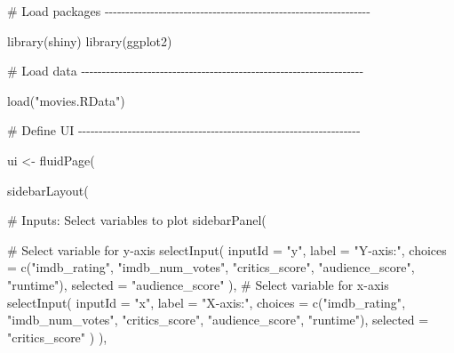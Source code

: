 \documentclass[
  letterpaper,
  DIV=11,
  numbers=noendperiod]{scrreprt}
\newenvironment{Shaded}{\begin{snugshade}}{\end{snugshade}}
\newcommand{\AttributeTok}[1]{\textcolor[rgb]{0.40,0.46,0.14}{#1}}
\newcommand{\CommentTok}[1]{\textcolor[rgb]{0.37,0.37,0.37}{#1}}
\newcommand{\FunctionTok}[1]{\textcolor[rgb]{0.28,0.35,0.67}{#1}}
\newcommand{\NormalTok}[1]{\textcolor[rgb]{0.00,0.46,0.62}{#1}}
\newcommand{\OtherTok}[1]{\textcolor[rgb]{0.00,0.46,0.62}{#1}}
\newcommand{\StringTok}[1]{\textcolor[rgb]{0.13,0.47,0.30}{#1}}
\begin{document}
\begin{Shaded}
\begin{Highlighting}[]
\CommentTok{\# Load packages {-}{-}{-}{-}{-}{-}{-}{-}{-}{-}{-}{-}{-}{-}{-}{-}{-}{-}{-}{-}{-}{-}{-}{-}{-}{-}{-}{-}{-}{-}{-}{-}{-}{-}{-}{-}{-}{-}{-}{-}{-}{-}{-}{-}{-}{-}{-}{-}{-}{-}{-}{-}{-}{-}{-}{-}{-}{-}{-}{-}{-}{-}{-}{-}}

\FunctionTok{library}\NormalTok{(shiny)}
\FunctionTok{library}\NormalTok{(ggplot2)}

\CommentTok{\# Load data {-}{-}{-}{-}{-}{-}{-}{-}{-}{-}{-}{-}{-}{-}{-}{-}{-}{-}{-}{-}{-}{-}{-}{-}{-}{-}{-}{-}{-}{-}{-}{-}{-}{-}{-}{-}{-}{-}{-}{-}{-}{-}{-}{-}{-}{-}{-}{-}{-}{-}{-}{-}{-}{-}{-}{-}{-}{-}{-}{-}{-}{-}{-}{-}{-}{-}{-}{-}}

\FunctionTok{load}\NormalTok{(}\StringTok{"movies.RData"}\NormalTok{)}

\CommentTok{\# Define UI {-}{-}{-}{-}{-}{-}{-}{-}{-}{-}{-}{-}{-}{-}{-}{-}{-}{-}{-}{-}{-}{-}{-}{-}{-}{-}{-}{-}{-}{-}{-}{-}{-}{-}{-}{-}{-}{-}{-}{-}{-}{-}{-}{-}{-}{-}{-}{-}{-}{-}{-}{-}{-}{-}{-}{-}{-}{-}{-}{-}{-}{-}{-}{-}{-}{-}{-}{-}}

\NormalTok{ui }\OtherTok{\textless{}{-}} \FunctionTok{fluidPage}\NormalTok{(}

  \FunctionTok{sidebarLayout}\NormalTok{(}

    \CommentTok{\# Inputs: Select variables to plot}
    \FunctionTok{sidebarPanel}\NormalTok{(}

      \CommentTok{\# Select variable for y{-}axis}
      \FunctionTok{selectInput}\NormalTok{(}
        \AttributeTok{inputId =} \StringTok{"y"}\NormalTok{,}
        \AttributeTok{label =} \StringTok{"Y{-}axis:"}\NormalTok{,}
        \AttributeTok{choices =} \FunctionTok{c}\NormalTok{(}\StringTok{"imdb\_rating"}\NormalTok{, }\StringTok{"imdb\_num\_votes"}\NormalTok{, }\StringTok{"critics\_score"}\NormalTok{, }\StringTok{"audience\_score"}\NormalTok{, }\StringTok{"runtime"}\NormalTok{),}
        \AttributeTok{selected =} \StringTok{"audience\_score"}
\NormalTok{      ),}
      \CommentTok{\# Select variable for x{-}axis}
      \FunctionTok{selectInput}\NormalTok{(}
        \AttributeTok{inputId =} \StringTok{"x"}\NormalTok{,}
        \AttributeTok{label =} \StringTok{"X{-}axis:"}\NormalTok{,}
        \AttributeTok{choices =} \FunctionTok{c}\NormalTok{(}\StringTok{"imdb\_rating"}\NormalTok{, }\StringTok{"imdb\_num\_votes"}\NormalTok{, }\StringTok{"critics\_score"}\NormalTok{, }\StringTok{"audience\_score"}\NormalTok{, }\StringTok{"runtime"}\NormalTok{),}
        \AttributeTok{selected =} \StringTok{"critics\_score"}
\NormalTok{      )}
\NormalTok{    ),}


\end{Highlighting}
\end{Shaded}
\end{document}
